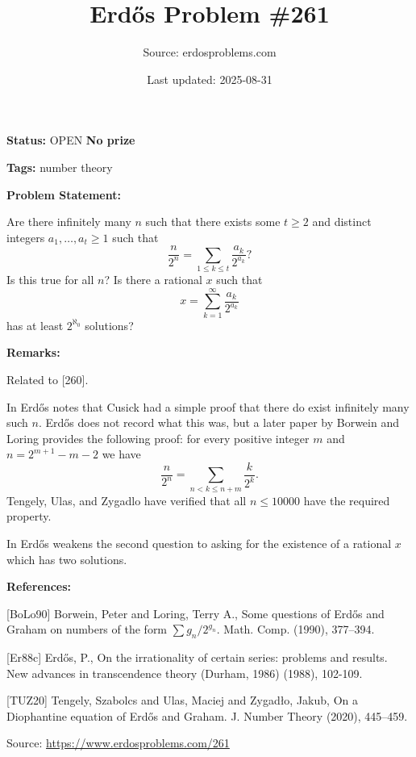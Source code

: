 \documentclass{article}
\title{Erd\H{o}s Problem \#261}
\date{Last updated: 2025-08-31}
\author{Source: erdosproblems.com}
\begin{document}
\maketitle

\noindent\textbf{Status:} OPEN \quad \textbf{No prize}

\noindent\textbf{Tags:} number theory

\medskip
\noindent\textbf{Problem Statement:}

Are there infinitely many $n$ such that there exists some $t\geq 2$ and distinct integers $a_1,\ldots,a_t\geq 1$ such that\[\frac{n}{2^n}=\sum_{1\leq k\leq t}\frac{a_k}{2^{a_k}}?\]Is this true for all $n$? Is there a rational $x$ such that\[x = \sum_{k=1}^\infty \frac{a_k}{2^{a_k}}\]has at least $2^{\aleph_0}$ solutions?

\bigskip
\noindent\textbf{Remarks:}

Related to [260].

In \cite{Er88c} Erd\H{o}s notes that Cusick had a simple proof that there do exist infinitely many such $n$. Erd\H{o}s does not record what this was, but a later paper by Borwein and Loring \cite{BoLo90} provides the following proof: for every positive integer $m$ and $n=2^{m+1}-m-2$ we have\[\frac{n}{2^n}=\sum_{n<k\leq n+m}\frac{k}{2^k}.\]Tengely, Ulas, and Zygadlo \cite{TUZ20} have verified that all $n\leq 10000$ have the required property.

In \cite{Er88c} Erd\H{o}s weakens the second question to asking for the existence of a rational $x$ which has two solutions.

\bigskip
\noindent\textbf{References:}

[BoLo90] Borwein, Peter and Loring, Terry A., Some questions of {E}rd\H{o}s and {G}raham on numbers of the
form {$\sum g_n/2^{g_n}$}. Math. Comp. (1990), 377--394.
 
 [Er88c] Erd\H{o}s, P., On the irrationality of certain series: problems and results. New advances in transcendence theory (Durham, 1986) (1988), 102-109.
 
 [TUZ20] Tengely, Szabolcs and Ulas, Maciej and Zygad\l o, Jakub, On a {D}iophantine equation of {E}rd\H{o}s and {G}raham. J. Number Theory (2020), 445--459.

\bigskip
\noindent\small{Source: \url{https://www.erdosproblems.com/261}}
\end{document}
